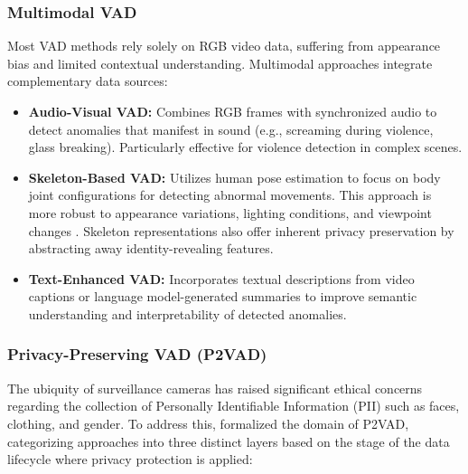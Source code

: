 \documentclass[12pt]{article}
\begin{document}
\subsubsection{Multimodal VAD}
Most VAD methods rely solely on RGB video data, suffering from appearance bias and limited contextual understanding. Multimodal approaches integrate complementary data sources:

\begin{itemize}
    \item \textbf{Audio-Visual VAD:} Combines RGB frames with synchronized audio to detect anomalies that manifest in sound (e.g., screaming during violence, glass breaking). Particularly effective for violence detection in complex scenes.
    
    \item \textbf{Skeleton-Based VAD:} Utilizes human pose estimation to focus on body joint configurations for detecting abnormal movements. This approach is more robust to appearance variations, lighting conditions, and viewpoint changes \citep{pang2024detecting}. Skeleton representations also offer inherent privacy preservation by abstracting away identity-revealing features.
    
    \item \textbf{Text-Enhanced VAD:} Incorporates textual descriptions from video captions or language model-generated summaries to improve semantic understanding and interpretability of detected anomalies.
\end{itemize}

\subsubsection{Privacy-Preserving VAD (P2VAD)}
The ubiquity of surveillance cameras has raised significant ethical concerns regarding the collection of Personally Identifiable Information (PII) such as faces, clothing, and gender. To address this, \cite{liu2025privacy} formalized the domain of P2VAD, categorizing approaches into three distinct layers based on the stage of the data lifecycle where privacy protection is applied:
\end{document}
